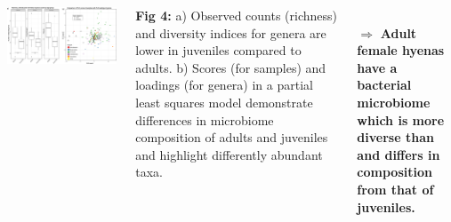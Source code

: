 \documentclass[30pt, a0paper, portrait, margin=0mm, innermargin=15mm,
               blockverticalspace=15mm, colspace=15mm, subcolspace=8mm]{tikzposter}
\begin{document}
\begin{columns}
 {

        \begin{minipage}{0.7\linewidth}                  
          \begin{left}
              \includegraphics[scale=0.9]{Figure3_man.png} 
          \end{left}
        \end{minipage}
        \hfill
        \begin{minipage}{0.3\linewidth}
          \textbf{Fig 4:} a) Observed counts (richness) and diversity
          indices for genera are lower in juveniles compared to
          adults. b) Scores (for samples) and loadings (for genera) in
          a partial least squares model demonstrate differences in
          microbiome composition of adults and juveniles and highlight
          differently abundant taxa.\\
        \end{minipage}

        \\ $\Rightarrow$ \textbf{Adult female hyenas have a
          bacterial microbiome which is more diverse than and differs
          in composition from that of juveniles.}  }


\end{columns}
\end{document}

